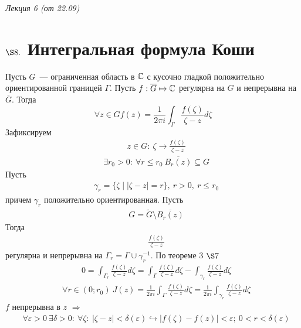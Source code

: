 \begin{flushright}
    \textit{Лекция 6 (от 22.09)}
\end{flushright}
\section{$\S 8.$ Интегральная формула Коши}
\theorem
Пусть $G$~--- ограниченная область в $\mathbb{C}$ с кусочно гладкой положительно
ориентированной границей $\Gamma$. Пусть $f: \overline{G} \mapsto \mathbb{C}$ регулярна
на $G$ и непрерывна на $\overline{G}$. Тогда
\begin{equation} \label{(8.1)}
    \forall z \in G f(z) = \frac{1}{2\pi i}\int_{\Gamma}\frac{f(\zeta)}{\zeta - z}d\zeta
\end{equation}
\pr
Зафиксируем
\begin{align*}
  & z \in G: \ \zeta \to \frac{f(\zeta)}{\zeta - z}
\end{align*}
\begin{align*}
  & \exists r_0 > 0: \ \forall r \leq r_0 \ \overline{B_r(z)} \subseteq G
\end{align*}
Пусть
\begin{align*}
  & \gamma_r = \{\zeta \mid \left| \zeta - z \right| = r\}, \ r > 0, \ r \leq r_0
\end{align*}
причем $\gamma_r$ положительно ориентированная. Пусть
\begin{align*}
  & G = \tilde{G} \setminus \overline{B_r(z)}
\end{align*}
Тогда
\begin{align*}
  & \frac{f(\zeta)}{\zeta - z}
\end{align*}
регулярна и непрерывна на $\Gamma_r = \Gamma \cup \gamma_r^{-1}$.
По теореме $3$ $\S 7$
\begin{align*}
  & 0 = \int_{\Gamma_r} \frac{f(\zeta)}{\zeta - z} d \zeta =  \int_{\Gamma} \frac{f(\zeta)}{\zeta - z} d \zeta - \int_{\gamma_r} \frac{f(\zeta)}{\zeta - z} d \zeta
\end{align*}
\begin{align*}
  & \forall r \in (0; r_0) \ J(z) = \frac{1}{2 \pi i} \int_{\Gamma} \frac{f(\zeta)}{\zeta - z} d \zeta = \frac{1}{2 \pi i} \int_{\gamma_r} \frac{f(\zeta)}{\zeta - z} d \zeta
\end{align*}
$f$ непрерывна в $z$ $\Rightarrow$
\begin{align*}
  & \forall \varepsilon > 0 \ \exists \delta > 0: \ \forall \zeta: \ \left| \zeta - z \right| < \delta(\varepsilon) \hookrightarrow \left| f(\zeta) - f(z) \right| < \varepsilon; \ 0 < r < \delta(\varepsilon)
\end{align*}
